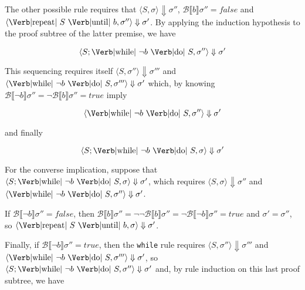\documentclass{article}
\begin{document}
\begin{enumerate}[2.]
    The other possible rule requires that
    $\langle S, \sigma \rangle \Downarrow \sigma''$,
    $\mathcal{B} \llbracket b \rrbracket \sigma'' = false$ and 
    $
      \langle 
        \text{\Verb|repeat| } S \text{ \Verb|until| } b,
        \sigma''
      \rangle \Downarrow \sigma'
    $. By applying the induction hypothesis to the proof
    subtree of the latter premise, we have 

    $$
      \langle 
        S;\text{\Verb|while| } \neg b \text{ \Verb|do| } S,
        \sigma'' 
      \rangle \Downarrow \sigma'
    $$

    This sequencing requires itself
    $
      \langle 
        S,
        \sigma''
      \rangle \Downarrow \sigma'''
    $ and 
    $
      \langle 
        \text{\Verb|while| } \neg b \text{ \Verb|do| } S,
        \sigma'''
      \rangle \Downarrow \sigma'
    $ which, by knowing 
    $
      \mathcal{B}\llbracket \neg b \rrbracket \sigma'' = 
      \neg \mathcal{B}\llbracket  b \rrbracket \sigma'' = true
    $ imply 

    $$
      \langle 
        \text{\Verb|while| } \neg b \text{ \Verb|do| } S,
        \sigma''
      \rangle \Downarrow \sigma'
    $$

    and finally 

    $$
      \langle 
      S;\text{\Verb|while| } \neg b \text{ \Verb|do| } S,
        \sigma
      \rangle \Downarrow \sigma'
    $$

    For the converse implication, suppose that 
    $
      \langle 
        S;\text{\Verb|while| } \neg b \text{ \Verb|do| } S,
        \sigma
      \rangle \Downarrow \sigma'
    $, which requires 
    $\langle S, \sigma \rangle \Downarrow \sigma''$
    and 
    $
      \langle 
        \text{\Verb|while| } \neg b \text{ \Verb|do| } S,
        \sigma''
      \rangle \Downarrow \sigma'
    $.

    If $\mathcal{B}\llbracket \neg b \rrbracket \sigma'' = false$,
    then 
    $
      \mathcal{B}\llbracket b \rrbracket \sigma'' =
      \neg \neg \mathcal{B}\llbracket b \rrbracket \sigma'' =
      \neg \mathcal{B}\llbracket \neg b \rrbracket \sigma'' = true
    $ and $\sigma' = \sigma''$, so 
    $
      \langle 
        \text{\Verb|repeat| } S \text{ \Verb|until| } b,
        \sigma
      \rangle \Downarrow \sigma'
    $.

    Finally, if 
    $\mathcal{B}\llbracket \neg b \rrbracket \sigma'' = true$,
    then the \verb|while| rule requires 
    $\langle S, \sigma'' \rangle \Downarrow \sigma'''$ and 
    $
      \langle 
        \text{\Verb|while| } \neg b \text{ \Verb|do| } S,
        \sigma'''
      \rangle \Downarrow \sigma'
    $, so 
    $
      \langle 
        S;\text{\Verb|while| } \neg b \text{ \Verb|do| } S,
        \sigma''
      \rangle \Downarrow \sigma'
    $ and, by rule induction on this last proof subtree, we have


\end{enumerate}
\end{document}
